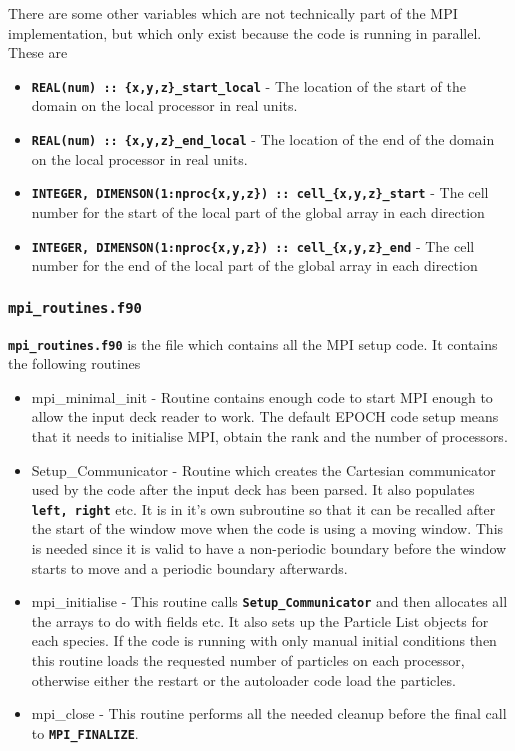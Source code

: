 \documentclass[12pt]{article}
\newcommand{\inlinecode}[1]{{\color{warwickred} \bf\texttt{#1}}}
\newcommand{\EPOCH}{{\color{warwickdark}\fontfamily{phv}\selectfont EPOCH} }
\begin{document}
There are some other variables which are not technically part of the MPI
implementation, but which only exist because the code is running in
parallel. These are
\begin{itemize}
\item \inlinecode{REAL(num) :: \{x,y,z\}\_start\_local} - The location of the
  start of the domain on the local processor in real units.
\item \inlinecode{REAL(num) :: \{x,y,z\}\_end\_local} - The location of the end
  of the domain on the local processor in real units.
\item \inlinecode{INTEGER, DIMENSON(1:nproc\{x,y,z\}) ::
    cell\_\{x,y,z\}\_start} - The cell number for the start of the local part
  of the global array in each direction
\item \inlinecode{INTEGER, DIMENSON(1:nproc\{x,y,z\}) :: cell\_\{x,y,z\}\_end}
  - The cell number for the end of the local part of the global array in each
  direction
\end{itemize}

\subsubsection{\inlinecode{mpi\_routines.f90}}
\inlinecode{mpi\_routines.f90} is the file which contains all the MPI setup
code. It contains the following routines
\begin{itemize}
\item mpi\_minimal\_init - Routine contains enough code to start MPI enough to
  allow the input deck reader to work. The default \EPOCH code setup means that
  it needs to initialise MPI, obtain the rank and the number of processors.
\item Setup\_Communicator - Routine which creates the Cartesian communicator
  used by the code after the input deck has been parsed. It also populates
  \inlinecode{left, right} etc. It is in it's own subroutine so that it can be
  recalled after the start of the window move when the code is using a moving
  window. This is needed since it is valid to have a non-periodic boundary
  before the window starts to move and a periodic boundary afterwards.
\item mpi\_initialise - This routine calls \inlinecode{Setup\_Communicator} and
  then allocates all the arrays to do with fields etc. It also sets up the
  Particle List objects for each species. If the code is running with only
  manual initial conditions then this routine loads the requested number of
  particles on each processor, otherwise either the restart or the autoloader
  code load the particles.
\item mpi\_close - This routine performs all the needed cleanup before the
  final call to \inlinecode{MPI\_FINALIZE}.
\end{itemize}
\end{document}

